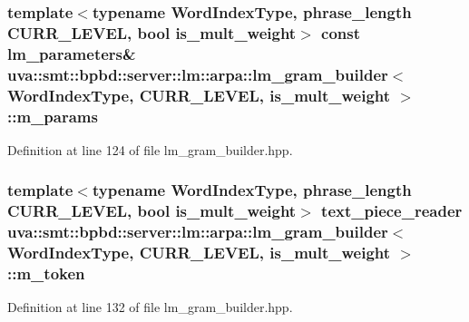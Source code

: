 \subsubsection[{m\+\_\+params}]{\setlength{\rightskip}{0pt plus 5cm}template$<$typename Word\+Index\+Type, phrase\+\_\+length C\+U\+R\+R\+\_\+\+L\+E\+V\+E\+L, bool is\+\_\+mult\+\_\+weight$>$ const {\bf lm\+\_\+parameters}\& {\bf uva\+::smt\+::bpbd\+::server\+::lm\+::arpa\+::lm\+\_\+gram\+\_\+builder}$<$ Word\+Index\+Type, C\+U\+R\+R\+\_\+\+L\+E\+V\+E\+L, is\+\_\+mult\+\_\+weight $>$\+::m\+\_\+params\hspace{0.3cm}{\ttfamily [protected]}}\label{classuva_1_1smt_1_1bpbd_1_1server_1_1lm_1_1arpa_1_1lm__gram__builder_ae9e727cf174b8d61d1e9f88ac30a50e5}


Definition at line 124 of file lm\+\_\+gram\+\_\+builder.\+hpp.

\hypertarget{classuva_1_1smt_1_1bpbd_1_1server_1_1lm_1_1arpa_1_1lm__gram__builder_a4c8cc56d2df6905cf6d24fa3cfe9669a}{}
\subsubsection[{m\+\_\+token}]{\setlength{\rightskip}{0pt plus 5cm}template$<$typename Word\+Index\+Type, phrase\+\_\+length C\+U\+R\+R\+\_\+\+L\+E\+V\+E\+L, bool is\+\_\+mult\+\_\+weight$>$ {\bf text\+\_\+piece\+\_\+reader} {\bf uva\+::smt\+::bpbd\+::server\+::lm\+::arpa\+::lm\+\_\+gram\+\_\+builder}$<$ Word\+Index\+Type, C\+U\+R\+R\+\_\+\+L\+E\+V\+E\+L, is\+\_\+mult\+\_\+weight $>$\+::m\+\_\+token\hspace{0.3cm}{\ttfamily [protected]}}\label{classuva_1_1smt_1_1bpbd_1_1server_1_1lm_1_1arpa_1_1lm__gram__builder_a4c8cc56d2df6905cf6d24fa3cfe9669a}


Definition at line 132 of file lm\+\_\+gram\+\_\+builder.\+hpp.

\hypertarget{classuva_1_1smt_1_1bpbd_1_1server_1_1lm_1_1arpa_1_1lm__gram__builder_af9cf5c614babb6928aaec282d2a8eb94}{}
